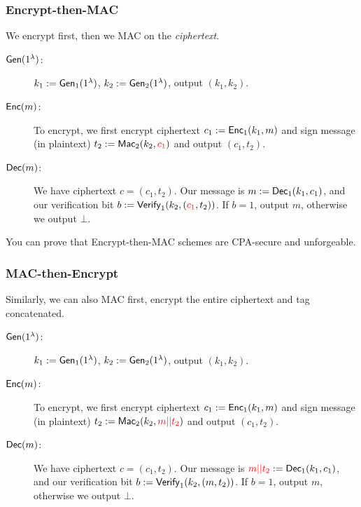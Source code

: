 \subsubsection{Encrypt-then-MAC}
We encrypt first, then we MAC on the \emph{ciphertext}.


\begin{description}
    \item[$\operatorname{\mathsf{Gen}}(1^\lambda)$:] $k_1:=\operatorname{\mathsf{Gen}}_1(1^\lambda)$, $k_2:=\operatorname{\mathsf{Gen}}_2(1^\lambda)$, output $(k_1, k_2)$.

    \item[$\operatorname{\mathsf{Enc}}(m)$:] To encrypt, we first encrypt ciphertext $c_1 := \operatorname{\mathsf{Enc}}_1(k_1, m)$ and sign message (in plaintext) $t_2 := \operatorname{\mathsf{Mac}}_2(k_2, {\color{red} c_1})$ and output $(c_1, t_2)$.

    \item[$\operatorname{\mathsf{Dec}}(m)$:] We have ciphertext $c = (c_1, t_2)$. Our message is $m:=\operatorname{\mathsf{Dec}}_1(k_1, c_1)$, and our verification bit $b := \operatorname{\mathsf{Verify}}_1(k_2, ({\color{red} c_1}, t_2))$. If $b = 1$, output $m$, otherwise we output $\bot$.
\end{description}

You can prove that Encrypt-then-MAC schemes are CPA-secure and unforgeable.

\subsubsection{MAC-then-Encrypt}
Similarly, we can also MAC first, encrypt the entire ciphertext and tag concatenated.


\begin{description}
    \item[$\operatorname{\mathsf{Gen}}(1^\lambda)$:] $k_1:=\operatorname{\mathsf{Gen}}_1(1^\lambda)$, $k_2:=\operatorname{\mathsf{Gen}}_2(1^\lambda)$, output $(k_1, k_2)$.

    \item[$\operatorname{\mathsf{Enc}}(m)$:] To encrypt, we first encrypt ciphertext $c_1 := \operatorname{\mathsf{Enc}}_1(k_1, m)$ and sign message (in plaintext) $t_2 := \operatorname{\mathsf{Mac}}_2(k_2, {\color{red} m||t_2})$ and output $(c_1, t_2)$.

    \item[$\operatorname{\mathsf{Dec}}(m)$:] We have ciphertext $c = (c_1, t_2)$. Our message is ${\color{red} m||t_2}:=\operatorname{\mathsf{Dec}}_1(k_1, c_1)$, and our verification bit $b := \operatorname{\mathsf{Verify}}_1(k_2, (m, t_2))$. If $b = 1$, output $m$, otherwise we output $\bot$.
\end{description}

